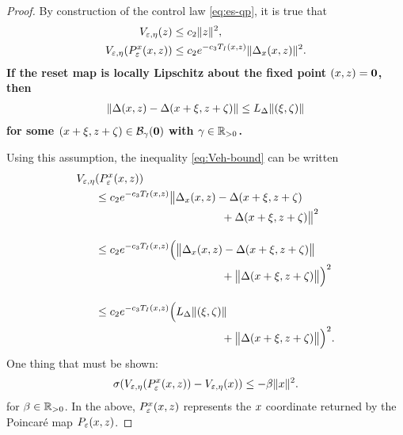 \documentclass[twocolumn]{article}
\begin{document}
\begin{proof}
  By construction of the control law \eqref{eq:es-qp}, it is true that
  \begin{align}
    V_{\varepsilon, \eta}(z) &\leq c_{2} \| z \|^{2},\\
    \nonumber
    V_{\varepsilon, \eta}(P_{\varepsilon}^{x}(x, z)) &\leq c_{2} e^{-c_{3} T_{I}(x, z)} \| \Delta_{x}(x, z) \|^{2}.
  \end{align}
  {\bf If the reset map is locally Lipschitz about the fixed point $(x, z) = \mathbf{0}$, then
    \begin{align}
      \label{eq:Veh-bound}
      \| \Delta(x, z) - \Delta(x + \xi, z + \zeta) \| \leq L_{\Delta} \| (\xi, \zeta) \|
    \end{align}
    for some $(x + \xi, z + \zeta) \in \mathcal{B}_{\gamma}(\mathbf{0})$ with $\gamma \in \mathbb{R}_{> 0}$.}
  
  Using this assumption, the inequality \eqref{eq:Veh-bound} can be written
  \begin{align}
    \nonumber
    \Vee&(\Pe^{\zdx}(\zdx, \zdz))\\
    \nonumber
    &\leq c_{2} e^{-c_{3} T_{I}(\zdx, \zdz)} \big\| \Delta_{\zdx}(\zdx, \zdz) - \Delta(\zdx + \zdxp, \zdz + \zdzp)\\
    \nonumber
    & \hspace{4cm}  + \Delta(\zdx + \zdxp, \zdz + \zdzp)\big\|^{2}\\[1em]
    \nonumber
    &\leq c_{2} e^{-c_{3} T_{I}(\zdx, \zdz)} \Big( \big\| \Delta_{\zdx}(\zdx, \zdz) - \Delta(\zdx + \zdxp, \zdz + \zdzp) \big\|\\
    \nonumber
    & \hspace{4cm} + \big\| \Delta(\zdx + \zdxp, \zdz + \zdzp) \big\| \Big)^{2}\\[1em]
    \nonumber
    &\leq c_{2} e^{-c_{3} T_{I}(\zdx, \zdz)} \Big( L_{\Delta} \| (\zdxp, \zdzp) \|\\
    \nonumber
    & \hspace{4cm} + \big\| \Delta(\zdx + \zdxp, \zdz + \zdzp) \big\| \Big)^{2}.
  \end{align}
  One thing that must be shown:
  \begin{align}
    \sigma(V_{\varepsilon, \eta}(P_{\varepsilon}^{x}(x, z)) - V_{\varepsilon, \eta}(x)) \leq -\beta \| x \|^{2}.
  \end{align}
  for $\beta \in \mathbb{R}_{> 0}$.
  In the above, $P_{\varepsilon}^{x}(x, z)$ represents the $x$ coordinate returned by the Poincar{\'e} map $P_{\varepsilon}(x, z)$.
\end{proof}
\end{document}

